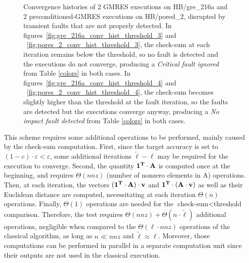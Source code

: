 \documentclass[twoside]{article}
\newcounter{fig}\setcounter{fig}{0}
\begin{document}
\begin{figure}[H]
\begin{minipage}[b]{0.48\linewidth}
      
    \end{minipage}
    \caption{Convergence histories of 2 GMRES executions on HB/gre_216a and 2 preconditioned-GMRES executions on HB/pored_2, disrupted by transient faults that are not properly detected. In figures~\ref{fig:gre_216a_conv_hist_threshold_3} and ~\ref{fig:pores_2_conv_hist_threshold_3}, the check-sum at each iteration remains below the threshold, so no fault is detected and the executions do not converge, producing a \emph{Critical fault ignored} from Table \ref{colors} in both cases. In figures~\ref{fig:gre_216a_conv_hist_threshold_4} and ~\ref{fig:pores_2_conv_hist_threshold_4}, the check-sum becomes slightly higher than the threshold at the fault iteration, so the faults are detected but the executions converge anyway, producing a \emph{No impact fault detected} from Table \ref{colors} in both cases. }\label{fig:conv_hist_threshold_false}
  \end{figure}
  This scheme requires some additional operations to be performed, mainly caused by the check-sum computation. First, since the target accuracy is set to $(1-c)\cdot \varepsilon < \varepsilon$, some additional iterations $\widetilde{\ell}-\ell$ may be required for the execution to converge. Second, the quantity $ \bf{1}^T \cdot A$ is computed once at the beginning, and requires $\Theta(nnz)$ (number of nonzero elements in A) operations. Then, at each iteration, the vectors  $(\bf{1}^T \cdot A) \cdot v$ and $\bf{1}^T \cdot (A \cdot v)$ as well as their Euclidean distance are computed, necessitating at each iteration $\Theta(n)$ operations. Finally, $\Theta(1)$ operations are needed for the $\text{check-sum} < \text{threshold}$ comparison. Therefore, the test requires $\Theta(nnz) + \Theta(n \cdot \widetilde{\ell})$ additional operations, negligible when compared to the $\Theta(\ell \cdot nnz)$ operations of the classical algorithm, as long as $n \ll nnz$ and $\widetilde{\ell} \approx \ell$. Moreover, those computations can be performed in parallel in a separate computation unit since their outputs are not used in the classical execution.
\end{document}
